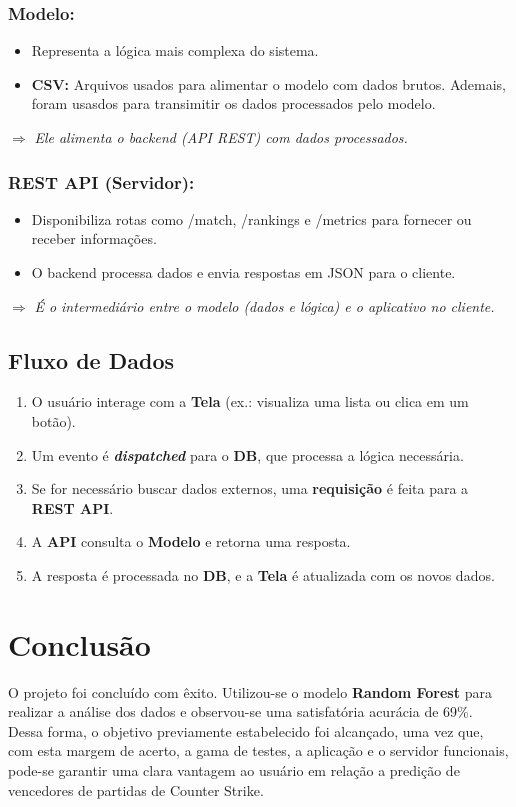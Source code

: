 \documentclass[a4paper,times,12pt]{article}
\begin{document}
\subsubsection{Modelo:}
\begin{itemize}
  \item Representa a lógica mais complexa do sistema.
  \item \textbf{CSV:} Arquivos usados para alimentar o modelo com dados brutos. Ademais, foram usasdos para transimitir os dados processados pelo modelo.
\end{itemize}
\noindent
\(\Rightarrow\) \textit{Ele alimenta o backend (API REST) com dados processados.}

\subsubsection{REST API (Servidor):}
\begin{itemize}
  \item Disponibiliza rotas como /match, /rankings e /metrics para fornecer ou receber informações.
  \item O backend processa dados e envia respostas em JSON para o cliente.
\end{itemize}
\noindent
\(\Rightarrow\) \textit{É o intermediário entre o modelo (dados e lógica) e o aplicativo no cliente.}

\subsection{Fluxo de Dados}
\begin{enumerate}
  \item O usuário interage com a \textbf{Tela} (ex.: visualiza uma lista ou clica em um botão).
  \item Um evento é \textbf{\textit{dispatched}} para o \textbf{DB}, que processa a lógica necessária.
  \item Se for necessário buscar dados externos, uma \textbf{requisição} é feita para a \textbf{REST API}.
  \item A \textbf{API} consulta o \textbf{Modelo} e retorna uma resposta.
  \item A resposta é processada no \textbf{DB}, e a \textbf{Tela} é atualizada com os novos dados.
\end{enumerate}

\section{Conclusão}
\hspace{+15pt}
O projeto foi concluído com êxito. Utilizou-se o modelo \textbf{Random Forest} para realizar a análise dos dados e observou-se uma satisfatória acurácia de 69\%. Dessa forma, o objetivo previamente estabelecido foi alcançado, uma vez que, com esta margem de acerto, a gama de testes, a aplicação e o servidor funcionais, pode-se garantir uma clara vantagem ao usuário em relação a predição de vencedores de partidas de Counter Strike. 
\end{document}
